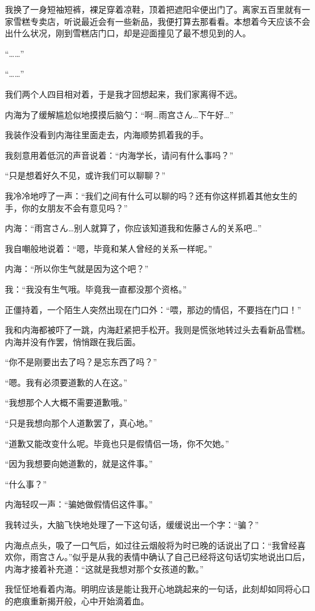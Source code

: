 我换了一身短袖短裤，裸足穿着凉鞋，顶着把遮阳伞便出门了。离家五百里就有一家雪糕专卖店，听说最近会有一些新品，我便打算去那看看。本想着今天应该不会出什么状况，刚到雪糕店门口，却是迎面撞见了最不想见到的人。

“……”

“……”

我们两个人四目相对着，于是我才回想起来，我们家离得不远。

内海为了缓解尴尬似地摸摸后脑勺：“啊…雨宫さん…下午好…”

我装作没看到内海往里面走去，内海顺势抓着我的手。

我刻意用着低沉的声音说着：“内海学长，请问有什么事吗？”

“只是想着好久不见，或许我们可以聊聊？”

我冷冷地哼了一声：“我们之间有什么可以聊的吗？还有你这样抓着其他女生的手，你的女朋友不会有意见吗？”

内海：“雨宫さん…别人就算了，你应该知道我和佐藤さん的关系吧…”

我自嘲般地说着：“嗯，毕竟和某人曾经的关系一样呢。”

内海：“所以你生气就是因为这个吧？”

我：“我没有生气哦。毕竟我一直都没那个资格。”

正僵持着，一个陌生人突然出现在门口外：“喂，那边的情侣，不要挡在门口！”

我和内海都被吓了一跳，内海赶紧把手松开。我则是慌张地转过头去看新品雪糕。内海并没有作罢，悄悄跟在我后面。

	“你不是刚要出去了吗？是忘东西了吗？”

	“嗯。我有必须要道歉的人在这。”

	“我想那个人大概不需要道歉哦。”

	“只是我想向那个人道歉罢了，真心地。”

	“道歉又能改变什么呢。毕竟也只是假情侣一场，你不欠她。”

	“因为我想要向她道歉的，就是这件事。”

	“什么事？”

内海轻叹一声：“骗她做假情侣这件事。”

我转过头，大脑飞快地处理了一下这句话，缓缓说出一个字：“骗？”

内海点点头，吸了一口气后，如过往云烟般将为时已晚的话说出了口：“我曾经喜欢你，雨宫さん。”似乎是从我的表情中确认了自己已经将这句话切实地说出口后，内海才接着补充道：“这就是我想对那个女孩道的歉。”

我怔怔地看着内海。明明应该是能让我开心地跳起来的一句话，此刻却如同将心口的疤痕重新揭开般，心中开始滴着血。

